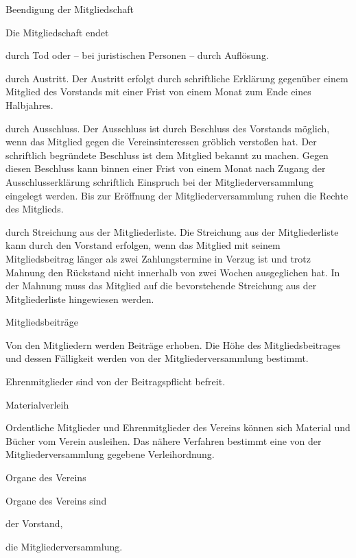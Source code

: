 \begin{para}{Beendigung der Mitgliedschaft}
\item Die Mitgliedschaft endet
	\begin{subpara}	
	\item durch Tod oder – bei juristischen Personen – durch Auflösung.
	\item durch Austritt.
	Der Austritt erfolgt durch schriftliche Erklärung gegenüber einem Mitglied des Vorstands mit einer Frist von einem Monat zum Ende eines Halbjahres.
	\item durch Ausschluss.
	Der Ausschluss ist durch Beschluss des Vorstands möglich, wenn das Mitglied gegen die Vereinsinteressen gröblich verstoßen hat. Der schriftlich begründete Beschluss ist dem Mitglied bekannt zu machen.
	Gegen diesen Beschluss kann binnen einer Frist von einem Monat nach Zugang der Ausschlusserklärung schriftlich Einspruch bei der Mitgliederversammlung eingelegt werden. Bis zur Eröffnung der Mitgliederversammlung ruhen die Rechte des Mitglieds.
	\item durch Streichung aus der Mitgliederliste.
	Die Streichung aus der Mitgliederliste kann durch den Vorstand erfolgen, wenn das Mitglied mit seinem Mitgliedsbeitrag länger als zwei Zahlungstermine in Verzug ist und trotz Mahnung den Rückstand nicht innerhalb von zwei Wochen ausgeglichen hat. In der Mahnung muss das Mitglied auf die bevorstehende Streichung aus der Mitgliederliste hingewiesen werden.
	\end{subpara}
\end{para}

\begin{para}{Mitgliedsbeiträge}
	\item Von den Mitgliedern werden Beiträge erhoben. Die Höhe des Mitgliedsbeitrages und dessen Fälligkeit werden von der Mitgliederversammlung bestimmt.
	\item Ehrenmitglieder sind von der Beitragspflicht befreit.
\end{para}

\begin{para}{Materialverleih}
	\item Ordentliche Mitglieder und Ehrenmitglieder des Vereins können sich Material und Bücher vom Verein ausleihen. Das nähere Verfahren bestimmt eine von der Mitgliederversammlung gegebene Verleihordnung.
\end{para}

\begin{para}{Organe des Vereins}
\item Organe des Vereins sind
	\begin{subpara}
	\item der Vorstand,
	\item die Mitgliederversammlung.
	\end{subpara}
\end{para}

